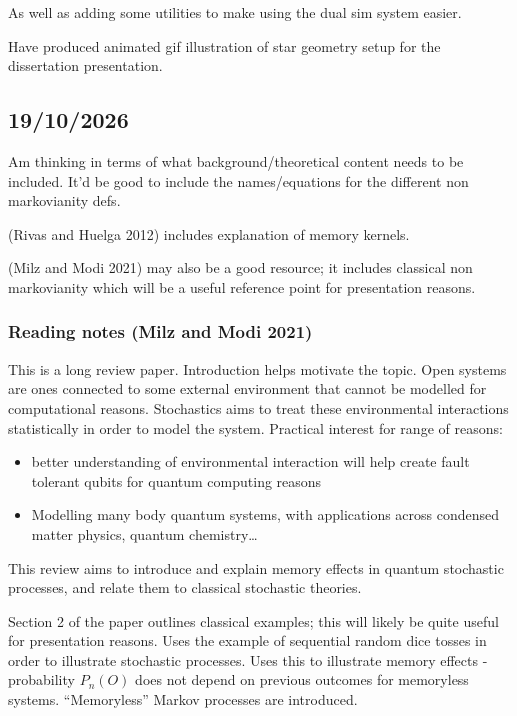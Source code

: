 \documentclass[
  letterpaper,
  DIV=11,
  numbers=noendperiod,
  oneside]{scrartcl}
\providecommand{\tightlist}{%
  \setlength{\itemsep}{0pt}\setlength{\parskip}{0pt}}
\begin{document}
As well as adding some utilities to make using the dual sim system
easier.

Have produced animated gif illustration of star geometry setup for the
dissertation presentation.

\subsection{19/10/2026}\label{section-3}

Am thinking in terms of what background/theoretical content needs to be
included. It'd be good to include the names/equations for the different
non markovianity defs.

(Rivas and Huelga 2012) includes explanation of memory kernels.

(Milz and Modi 2021) may also be a good resource; it includes classical
non markovianity which will be a useful reference point for presentation
reasons.

\subsubsection{Reading notes (Milz and Modi
2021)}\label{reading-notes-quantumstochasticprocesses2021}

This is a long review paper. Introduction helps motivate the topic. Open
systems are ones connected to some external environment that cannot be
modelled for computational reasons. Stochastics aims to treat these
environmental interactions statistically in order to model the system.
Practical interest for range of reasons:

\begin{itemize}
\tightlist
\item
  better understanding of environmental interaction will help create
  fault tolerant qubits for quantum computing reasons
\item
  Modelling many body quantum systems, with applications across
  condensed matter physics, quantum chemistry\ldots{}
\end{itemize}

This review aims to introduce and explain memory effects in quantum
stochastic processes, and relate them to classical stochastic theories.

Section 2 of the paper outlines classical examples; this will likely be
quite useful for presentation reasons. Uses the example of sequential
random dice tosses in order to illustrate stochastic processes. Uses
this to illustrate memory effects - probability \(P_{n}(O)\) does not
depend on previous outcomes for memoryless systems. ``Memoryless''
Markov processes are introduced.
\end{document}
